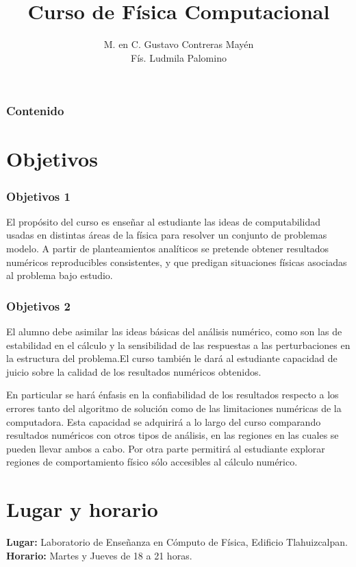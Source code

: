 \documentclass[12pt]{beamer}
\title{Curso de F\'{i}sica Computacional}
\author[]{M. en C. Gustavo Contreras May\'{e}n \\ F\'{i}s. Ludmila Palomino}
\date{ }
\begin{document}
\maketitle
\fontsize{14}{14}\selectfont
{}
\begin{frame}
\frametitle{Contenido}
\tableofcontents[pausesections]
\end{frame}
\section{Objetivos}
\begin{frame}
\frametitle{Objetivos 1}
El prop\'{o}sito del curso es enseñar al estudiante las ideas de computabilidad usadas en distintas \'{a}reas de la  f\'{i}sica para resolver un conjunto de problemas modelo. A partir de planteamientos anal\'{i}ticos se pretende obtener resultados num\'{e}ricos reproducibles consistentes, y que predigan situaciones f\'{i}sicas asociadas al problema bajo estudio.
\end{frame}
\begin{frame}
\frametitle{Objetivos 2}
El alumno debe asimilar las ideas b\'{a}sicas del an\'{a}lisis num\'{e}rico, como son las de estabilidad en el c\'{a}lculo y la sensibilidad de las respuestas a las perturbaciones en la estructura del problema.El curso también le dar\'{a} al estudiante capacidad de juicio sobre la calidad de los resultados num\'{e}ricos obtenidos.
\end{frame}
\begin{frame}
En particular se har\'{a} \'{e}nfasis en la confiabilidad de los resultados respecto a los errores tanto del algoritmo de soluci\'{o}n como de las limitaciones num\'{e}ricas de la computadora. Esta capacidad se adquirir\'{a} a lo largo del curso comparando resultados num\'{e}ricos con otros tipos de an\'{a}lisis, en las regiones en las cuales se pueden llevar ambos a cabo. Por otra parte permitir\'{a} al estudiante explorar regiones de comportamiento f\'{i}sico s\'{o}lo accesibles al c\'{a}lculo num\'{e}rico.
\end{frame}
\section{Lugar y horario}
\begin{frame} 
\textbf{Lugar: }Laboratorio de Enseñanza en C\'{o}mputo de F\'{i}sica, Edificio Tlahuizcalpan.
\\
\bigskip
\textbf{Horario: } Martes y Jueves de 18 a 21 horas.
\end{frame}
\end{document}
